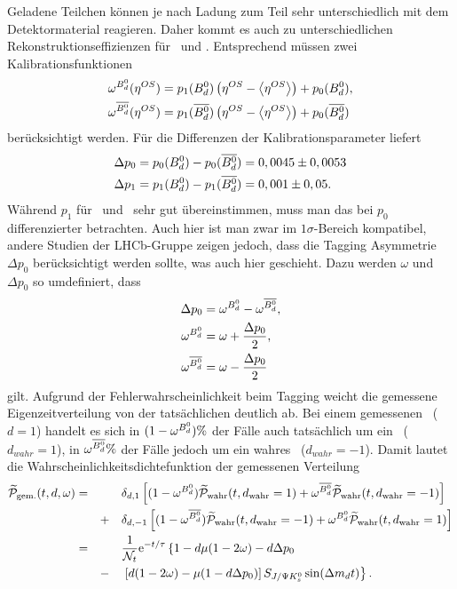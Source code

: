 Geladene Teilchen können je nach Ladung zum Teil sehr unterschiedlich mit dem Detektormaterial reagieren. Daher kommt es auch zu unterschiedlichen Rekonstruktionseffizienzen für \Bd\ und \Bdbar. Entsprechend müssen zwei Kalibrationsfunktionen 
\begin{align}
\omega^{\text{$B_d^0$}}(\eta^{OS}) &= p_1(\text{$B_d^0$})\left(\eta^{OS}-\left\langle \eta^{OS} \right\rangle\right) + p_0(\text{$B_d^0$}) , \\
\omega^{\text{$\overline{B_d^0}$}}(\eta^{OS}) &= p_1(\text{$\overline{B_d^0}$})\left(\eta^{OS}-\left\langle \eta^{OS} \right\rangle\right) + p_0(\text{$\overline{B_d^0}$})
\end{align}
berücksichtigt werden. Für die Differenzen der Kalibrationsparameter liefert \cite{tagging}
\begin{align}
\Delta p_0 &= p_0(\text{$B_d^0$}) - p_0(\text{$\overline{B_d^0}$}) = 0,0045 \pm 0,0053 \\
\Delta p_1 &= p_1(\text{$B_d^0$}) - p_1(\text{$\overline{B_d^0}$}) = 0,001 \pm 0,05 .
\end{align}
Während $p_1$ für \Bd\ und \Bdbar\ sehr gut übereinstimmen, muss man das bei $p_0$ differenzierter betrachten. Auch hier ist man zwar im $1\sigma$-Bereich kompatibel, andere Studien der LHCb-Gruppe zeigen jedoch, dass die Tagging Asymmetrie $\Delta p_0$ berücksichtigt werden sollte, was auch hier geschieht. Dazu werden $\omega$ und $\Delta p_0$ so umdefiniert, dass
\begin{align}
\Delta p_0 &= \omega^{\text{$B_d^0$}} - \omega^{\text{$\overline{B_d^0}$}}, \\
\omega^{\text{$B_d^0$}} &= \omega + \frac{\Delta p_0}{2},  \\
\omega^{\text{$\overline{B_d^0}$}} &= \omega - \frac{\Delta p_0}{2}
\end{align}
gilt. Aufgrund der Fehlerwahrscheinlichkeit beim Tagging weicht die gemessene Eigenzeitverteilung von der tatsächlichen deutlich ab. Bei einem gemessenen \Bd\ ($d=1$) handelt es sich in $(1-\omega^{\text{$B_d^0$}})\%$ der Fälle auch tatsächlich um ein \Bd\ ($d_{wahr}=1$), in $\omega^{\text{$\overline{B_d^0}$}}\%$ der Fälle jedoch um ein wahres \Bdbar\ ($d_{wahr}=-1$). Damit lautet die Wahrscheinlichkeitsdichtefunktion der gemessenen Verteilung
\begin{alignat}{3}
\nonumber\widetilde{\mathcal{P}}_{\text{gem.}}(t, d, \omega) &= && &&\delta_{d,1} \left[(1-\omega^{\text{$B_d^0$}})\widetilde{\mathcal{P}}_{\text{wahr}}(t, d_{\text{wahr}}=1) + \omega^{\text{$\overline{B_d^0}$}}\widetilde{\mathcal{P}}_{\text{wahr}}(t, d_{\text{wahr}}=-1)\right]\\
\nonumber & && + &&\delta_{d,-1} \left[(1-\omega^{\text{$\overline{B_d^0}$}})\widetilde{\mathcal{P}}_{\text{wahr}}(t, d_{\text{wahr}}=-1) + \omega^{\text{$B_d^0$}}\widetilde{\mathcal{P}}_{\text{wahr}}(t, d_{\text{wahr}}=1)\right] \\
\nonumber &= && &&\frac{1}{\mathcal{N}_t}\mathrm{e}^{-t/\tau} \left\lbrace 1-d\mu(1-2\omega)-d\Delta p_0 \right. \\
& && - && \left.\left[d(1-2\omega)-\mu(1-d\Delta p_0)\right]S_{J/\Psi K_s^0}\sin(\Delta m_d t)\right\rbrace. \label{eq:fit_pdf_vorlaeufig}
\end{alignat}

